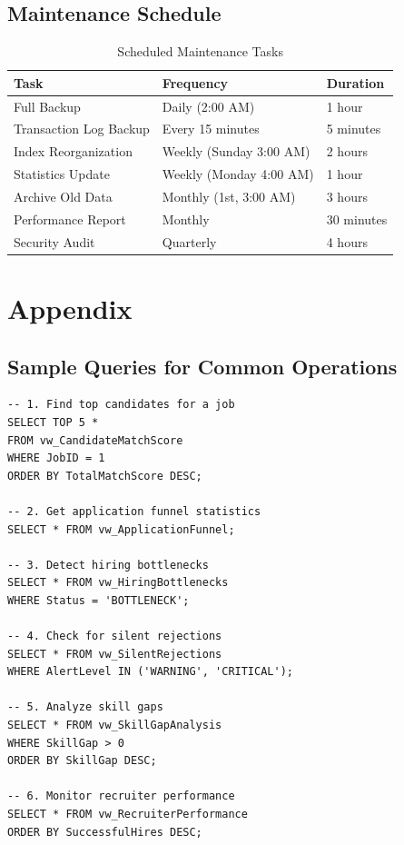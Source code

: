\documentclass[11pt,a4paper]{article}
\begin{document}
\subsection{Maintenance Schedule}
\begin{table}[H]
    \centering
    \begin{tabular}{|l|l|l|}
        \hline
        \rowcolor{tableheader}
        \textbf{Task} & \textbf{Frequency} & \textbf{Duration} \\
        \hline
        Full Backup & Daily (2:00 AM) & 1 hour \\
        \hline
        Transaction Log Backup & Every 15 minutes & 5 minutes \\
        \hline
        Index Reorganization & Weekly (Sunday 3:00 AM) & 2 hours \\
        \hline
        Statistics Update & Weekly (Monday 4:00 AM) & 1 hour \\
        \hline
        Archive Old Data & Monthly (1st, 3:00 AM) & 3 hours \\
        \hline
        Performance Report & Monthly & 30 minutes \\
        \hline
        Security Audit & Quarterly & 4 hours \\
        \hline
    \end{tabular}
    \caption{Scheduled Maintenance Tasks}
\end{table}

\section{Appendix}

\subsection{Sample Queries for Common Operations}

\begin{verbatim}
-- 1. Find top candidates for a job
SELECT TOP 5 *
FROM vw_CandidateMatchScore
WHERE JobID = 1
ORDER BY TotalMatchScore DESC;

-- 2. Get application funnel statistics
SELECT * FROM vw_ApplicationFunnel;

-- 3. Detect hiring bottlenecks
SELECT * FROM vw_HiringBottlenecks
WHERE Status = 'BOTTLENECK';

-- 4. Check for silent rejections
SELECT * FROM vw_SilentRejections
WHERE AlertLevel IN ('WARNING', 'CRITICAL');

-- 5. Analyze skill gaps
SELECT * FROM vw_SkillGapAnalysis
WHERE SkillGap > 0
ORDER BY SkillGap DESC;

-- 6. Monitor recruiter performance
SELECT * FROM vw_RecruiterPerformance
ORDER BY SuccessfulHires DESC;
\end{verbatim}
\end{document}
